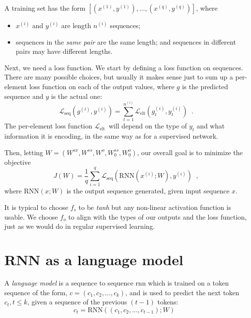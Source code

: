 A training  set has the form
$\left[\left(x^{(1)}, y^{(1)}\right), \dots, \left(x^{(q)},
    y^{(q)}\right)\right]$, where
\begin{itemize}
  \item
        $x^{(i)}$ and $y^{(i)}$ are length $n^{(i)}$ sequences;
  \item
        sequences in the {\it{same pair}} are the same length; and
        sequences in different pairs may have different lengths.
\end{itemize}

Next, we need a loss function.  We start by defining a loss function
on sequences.  There are many possible choices, but usually it makes
sense just to sum up a per-element loss function on each of the output
values, where $g$ is the predicted sequence and $y$ is the actual one:
\begin{equation}
  \mathcal{L}_{\text{seq}}\left(g^{(i)}, y^{(i)}\right) = \sum_{t =
    1}^{n^{(i)}}\mathcal{L}_\text{elt}\left(g_t^{(i)},
  y_t^{(i)}\right) \;\;.
\end{equation}
The per-element loss function $\mathcal{L}_\text{elt}$\ will depend on
the type of $y_t$
and what information it is encoding, in the same way as for a
supervised network.

Then, letting $W =\left(W^{sx}, W^{ss}, W^o, W^{ss}_0,
  W_0^o\right)$, our overall goal is to minimize the objective
\begin{equation}
  J(W) = \frac{1}{q} \sum_{i = 1}^q\mathcal{L}_{\text{seq}}\left(
  \text{RNN}(x^{(i)};W), y^{(i)}\right) \;\;,
\end{equation}
where $\text{RNN}(x; W)$ is the output sequence generated, given
input sequence $x$.

It is typical to choose $f_s$ to be {\it tanh}  but any non-linear
activation function is usable.  We choose  $f_o$ to align with the
types of our outputs and the loss function,  just as we would do in
regular supervised learning.


\section{RNN as a language model}
\label{sec-language}

A {\em language model} is a sequence to sequence {\sc rnn} which is
trained on a token sequence of the form, $c = (c_1, c_2,
  \ldots, c_k)$, and is used to predict the next token $c_t, t \leq k$,
given a sequence of the previous $(t-1)$ tokens:
\begin{equation}
  c_t = \text{RNN}\left((c_1, c_2, \dots, c_{t - 1}) ; W \right)\;\;
\end{equation}

